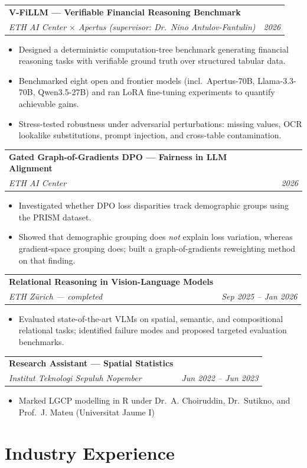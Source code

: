 \documentclass[10.5pt,a4paper]{article}
\makeatletter
\newcommand{\entry}[4]{%
  \noindent\begin{tabularx}{\linewidth}{@{}Xr@{}}
    \textbf{#1} & \textbf{#3} \\
    \textit{#2} & \textit{#4} \\
  \end{tabularx}\vspace{0.15em}
}
\newenvironment{bullets}
  {\begin{itemize}[leftmargin=1.1em,itemsep=0.12em,topsep=0.18em,parsep=0pt]}
  {\end{itemize}}
\makeatother
\begin{document}
\entry{V-FiLLM --- Verifiable Financial Reasoning Benchmark}{ETH AI Center $\times$ Apertus (supervisor: Dr.\ Nino Antulov-Fantulin)}{}{2026}
\begin{bullets}
  \item Designed a deterministic computation-tree benchmark generating financial reasoning tasks
        with verifiable ground truth over structured tabular data.
  \item Benchmarked eight open and frontier models (incl.\ Apertus-70B, Llama-3.3-70B, Qwen3.5-27B)
        and ran LoRA fine-tuning experiments to quantify achievable gains.
  \item Stress-tested robustness under adversarial perturbations: missing values, OCR lookalike
        substitutions, prompt injection, and cross-table contamination.
\end{bullets}

\entry{Gated Graph-of-Gradients DPO --- Fairness in LLM Alignment}{ETH AI Center}{}{2026}
\begin{bullets}
  \item Investigated whether DPO loss disparities track demographic groups using the PRISM dataset.
  \item Showed that demographic grouping does \textit{not} explain loss variation, whereas
        gradient-space grouping does; built a graph-of-gradients reweighting method on that finding.
\end{bullets}

\entry{Relational Reasoning in Vision-Language Models}{ETH Zürich --- completed}{}{Sep 2025 -- Jan 2026}
\begin{bullets}
  \item Evaluated state-of-the-art VLMs on spatial, semantic, and compositional relational tasks;
        identified failure modes and proposed targeted evaluation benchmarks.
\end{bullets}

\entry{Research Assistant --- Spatial Statistics}{Institut Teknologi Sepuluh Nopember}{}{Jun 2022 -- Jun 2023}
\begin{bullets}
  \item Marked LGCP modelling in R under Dr.\ A. Choiruddin, Dr.\ Sutikno, and Prof.\ J. Mateu
        (Universitat Jaume I)
\end{bullets}

\section{Industry Experience}
\end{document}
